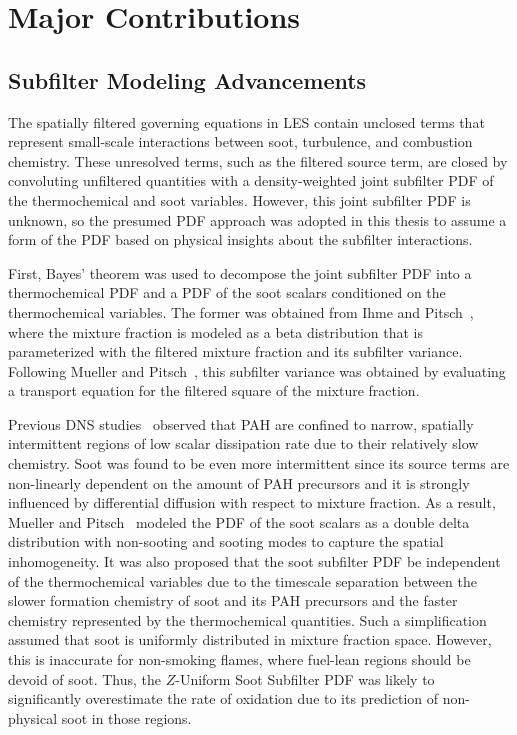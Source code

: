 \section{Major Contributions}
\label{sec:conclusion:contributions}

\subsection{Subfilter Modeling Advancements}
\label{sec:conclusion:contributions:subfilter}

The spatially filtered governing equations in LES contain unclosed terms that represent small-scale interactions between soot, turbulence, and combustion chemistry. These unresolved terms, such as the filtered source term, are closed by convoluting unfiltered quantities with a density-weighted joint subfilter PDF of the thermochemical and soot variables. However, this joint subfilter PDF is unknown, so the presumed PDF approach was adopted in this thesis to assume a form of the PDF based on physical insights about the subfilter interactions.

First, Bayes' theorem was used to decompose the joint subfilter PDF into a thermochemical PDF and a PDF of the soot scalars conditioned on the thermochemical variables. The former was obtained from Ihme and Pitsch~\cite{ihme2008}, where the mixture fraction is modeled as a beta distribution that is parameterized with the filtered mixture fraction and its subfilter variance. Following Mueller and Pitsch~\cite{mueller2012}, this subfilter variance was obtained by evaluating a transport equation for the filtered square of the mixture fraction. 

Previous DNS studies~\cite{bisetti2012,attili2014,attili2015} observed that PAH are confined to narrow, spatially intermittent regions of low scalar dissipation rate due to their relatively slow chemistry. Soot was found to be even more intermittent since its source terms are non-linearly dependent on the amount of PAH precursors and it is strongly influenced by differential diffusion with respect to mixture fraction. As a result, Mueller and Pitsch~\cite{subfilterpdf2011} modeled the PDF of the soot scalars as a double delta distribution with non-sooting and sooting modes to capture the spatial inhomogeneity. It was also proposed that the soot subfilter PDF be independent of the thermochemical variables due to the timescale separation between the slower formation chemistry of soot and its PAH precursors and the faster chemistry represented by the thermochemical quantities. Such a simplification assumed that soot is uniformly distributed in mixture fraction space. However, this is inaccurate for non-smoking flames, where fuel-lean regions should be devoid of soot. Thus, the $Z$-Uniform Soot Subfilter PDF was likely to significantly overestimate the rate of oxidation due to its prediction of non-physical soot in those regions.

